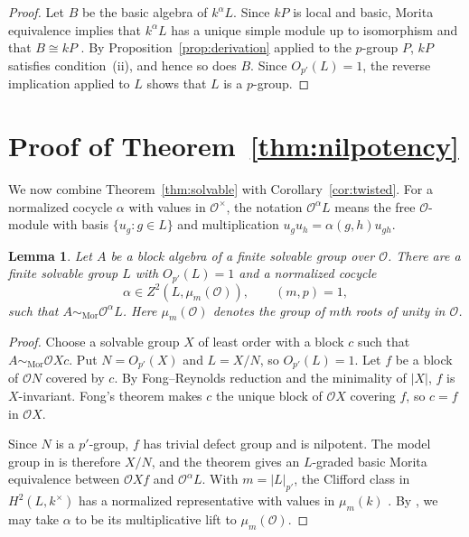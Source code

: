 \documentclass[11pt,a4paper]{article}
\newtheorem{lemma}[theorem]{Lemma}
\theoremstyle{definition}
\theoremstyle{remark}
\numberwithin{equation}{section}
\newcommand{\cO}{\mathcal{O}}
\newcommand{\Mor}{\mathrm{Mor}}
\begin{document}
	\begin{proof}
		Let $B$ be the basic algebra of $k^\alpha L$. Since $kP$ is local
		and basic, Morita equivalence implies that $k^\alpha L$ has a unique
		simple module up to isomorphism and that $B\cong kP$
		\cite[Corollary~4.9.6]{Linckelmann2018a}.
		By Proposition~\ref{prop:derivation} applied to the $p$-group $P$,
		$kP$ satisfies condition~\textup{(ii)}, and hence so does $B$.
		Since $O_{p'}(L)=1$, the reverse implication applied to $L$ shows
		that $L$ is a $p$-group.
	\end{proof}
	
	\section{Proof of Theorem~\ref*{thm:nilpotency}}\label{sec:integral}
	
	We now combine Theorem~\ref{thm:solvable} with Corollary~\ref{cor:twisted}.
	For a normalized cocycle $\alpha$ with values in $\cO^\times$, the notation $\cO^\alpha L$ means the free $\cO$-module with basis $\{u_g:g\in L\}$ and multiplication $u_gu_h=\alpha(g,h)u_{gh}$.
	
	\begin{lemma}\label{lem:fong}
		Let $A$ be a block algebra of a finite solvable group over $\cO$.
		There are a finite solvable group $L$ with $O_{p'}(L)=1$ and a normalized cocycle
		\[
		\alpha\in Z^2(L,\mu_m(\cO)),\qquad (m,p)=1,
		\]
		such that $A\sim_{\Mor}\cO^\alpha L$.
		Here $\mu_m(\cO)$ denotes the group of $m$th roots of unity in $\cO$.
	\end{lemma}
	
	\begin{proof}
		Choose a solvable group $X$ of least order with a block $c$ such that
		$A\sim_{\Mor}\cO Xc$. Put $N=O_{p'}(X)$ and $L=X/N$, so $O_{p'}(L)=1$.
		Let $f$ be a block of $\cO N$ covered by $c$. By Fong--Reynolds
		reduction \cite[Theorem~6.8.3]{Linckelmann2018b} and the minimality of $|X|$, $f$ is
		$X$-invariant. Fong's theorem \cite[Theorem~10.20]{Navarro1998} makes $c$ the
		unique block of $\cO X$ covering $f$, so $c=f$ in $\cO X$.
		
		Since $N$ is a $p'$-group, $f$ has trivial defect group and is nilpotent.
		The model group in \cite[Theorem~1.1(b)]{CoconetMarcusTodea2020} is therefore $X/N$, and
		the theorem gives an $L$-graded basic Morita equivalence between
		$\cO Xf$ and $\cO^\alpha L$.
		With $m=|L|_{p'}$, the Clifford class in $H^2(L,k^\times)$ has a
		normalized representative with values in $\mu_m(k)$
		\cite[Proposition~1.2.9(ii)]{Linckelmann2018a}. By \cite[p.~6 of the arXiv version]{CoconetMarcusTodea2020}, we may take
		$\alpha$ to be its multiplicative lift to $\mu_m(\cO)$.
	\end{proof}
	
\end{document}
